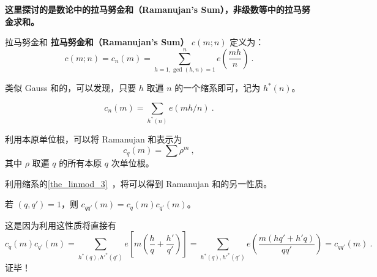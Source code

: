 

\textbf{这里探讨的是数论中的拉马努金和（Ramanujan's Sum），非级数等中的拉马努金求和。}

\begin{definition}{拉马努金和}
\textbf{拉马努金和（Ramanujan's Sum）} $c(m; n)$ 定义为：
\begin{equation}
c(m; n) = c_n(m) = \sum_{h=1, \gcd(h, n)=1}^{n} e\left(\frac{mh}{n}\right) ~.
\end{equation}
\end{definition}
类似 Gauss 和的，可以发现，只要 $h$ 取遍 $n$ 的一个缩系即可，记为 $h^*(n)$。
\begin{theorem}{}
\begin{equation}
c_n(m) = \sum_{h^*(n)} e\left(mh/n\right) ~.
\end{equation}

\end{theorem}

\begin{theorem}{}
利用本原单位根，可以将 Ramanujan 和表示为
\begin{equation}
c_q(m) = \sum \rho^m~,
\end{equation}
其中 $\rho$ 取遍 $q$ 的所有本原 $q$ 次单位根。
\end{theorem}

利用缩系的\autoref{the_linmod_3}~，将可以得到 Ramanujan 和的另一性质。
\begin{theorem}{}
若 $(q, q') = 1$，则 $c_{qq'}(m) = c_q(m) c_{q'}(m)$。
\end{theorem}
这是因为利用这性质将直接有
\begin{equation}
c_q(m) c_{q'}(m) = \sum_{h^*(q), h'^*(q')} e\left[ m\left(\frac{h}{q} + \frac{h'}{q'}\right) \right] = \sum_{h^*(q), h'^*(q')} e\left( \frac{m(hq' + h'q)}{q q'} \right) = c_{qq'}(m)~.
\end{equation}
证毕！


